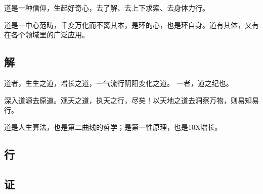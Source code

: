 道是一种信仰，生起好奇心，去了解、去上下求索、去身体力行。

道是一中心范畴，千变万化而不离其本，是环的心，也是环自身。道有其体，又有在各个领域里的广泛应用。

\subsection{解}

道者，生生之道，增长之道，一气流行阴阳变化之道。
一者，道之纪也。

深入道源去原道。观天之道，执天之行，尽矣！以天地之道去洞察万物，则易知易行。

道是人生算法，也是第二曲线的哲学；是第一性原理，也是10X增长。

\subsection{行}

\subsection{证}

